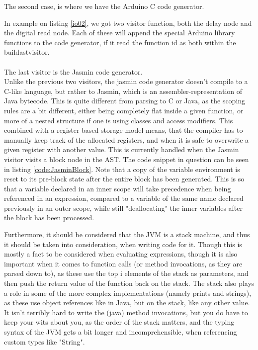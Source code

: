 The second case, is where we have the Arduino C code generator.

\noindent\newline

In example on listing \ref{io02}, we got two visitor function, both the delay node and the digital read node. Each of these will append the special Arduino library functions to the code generator, if it read the function id as both within the buildastvisitor. \\
\\
The last visitor is the Jasmin code generator.\\
Unlike the previous two visitors, the jasmin code generator doesn't compile to a C-like language, but rather to Jasmin, which is an assembler-representation of Java bytecode. This is quite different from parsing to C or Java, as the scoping rules are a bit different, either being completely flat inside a given function, or more of a nested structure if one is using classes and access modifiers. This combined with a register-based storage model means, that the compiler has to manually keep track of the allocated registers, and when it is safe to overwrite a given register with another value. This is currently handled when the Jasmin visitor visits a block node in the AST. The code snippet in question can be seen in listing \ref{code:JasminBlock}. Note that a copy of the variable environment is reset to its pre-block state after the entire block has been generated. This is so that a variable declared in an inner scope will take precedence when being referenced in an expression, compared to a variable of the same name declared previously in an outer scope, while still "deallocating" the inner variables after the block has been processed.


Furthermore, it should be considered that the JVM is a stack machine, and thus it should be taken into consideration, when writing code for it. Though this is mostly a fact to be considered when evaluating expressions, though it is also important when it comes to function calls (or method invocations, as they are parsed down to), as these use the top i elements of the stack as parameters, and then push the return value of the function back on the stack. The stack also plays a role in some of the more complex implementations (namely prints and strings), as these use object references like in Java, but on the stack, like any other value. It isn't terribly hard to write the (java) method invocations, but you do have to keep your wits about you, as the order of the stack matters, and the typing syntax of the JVM gets a bit longer and incomprehensible, when referencing custom types like "String".
